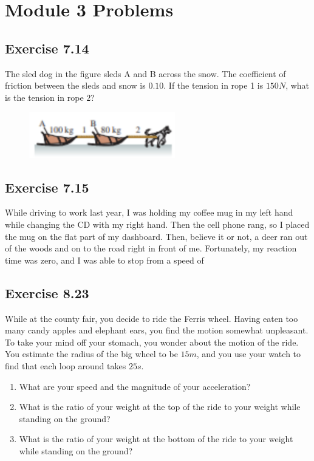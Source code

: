 \documentclass[11pt]{article}
\newenvironment{exercise}{
    \begin{mdframed}[style=problemstyle]\textcolor{black}{}
}{
    \end{mdframed}
}
\begin{document}
\section*{Module 3 Problems}
\subsection*{Exercise 7.14}
\begin{exercise}
    The sled dog in the figure sleds A and B across the snow. The coefficient
    of friction between the sleds and snow is $0.10$. If the tension in rope 1
    is $150N$, what is the tension in rope $2$?
\end{exercise}

\begin{figure}[ht!]
    \centering
    \includegraphics[width=2.5in]{images/exercise714.png}
\end{figure}

\newpage
\subsection*{Exercise 7.15}
\begin{exercise}
    While driving to work last year, I was holding 
    my coffee mug in my left hand while changing the CD 
    with my right hand. Then the cell phone rang, so I 
    placed the mug on the flat part of my dashboard. Then, 
    believe it or not, a deer ran out of the woods and on to 
    the road right in front of me. Fortunately, my reaction time was 
    zero, and I was able to stop from a speed of 
\end{exercise}

\subsection*{Exercise 8.23}
\begin{exercise}
    While at the county fair, you decide to ride the Ferris wheel. 
    Having eaten too many candy apples and elephant ears, you find the 
    motion somewhat unpleasant. To take your mind off your stomach, you 
    wonder about the motion of the ride. You estimate the radius of the 
    big wheel to be $15m$, and you use your watch to find that each loop 
    around takes $25s$.
    \begin{enumerate}[label=\alph*]
        \item What are your speed and the magnitude of your acceleration?
        \item What is the ratio of your weight at the top of the ride to 
            your weight while standing on the ground?
        \item What is the ratio of your weight at the bottom of the ride 
            to your weight while standing on the ground?
    \end{enumerate}
\end{exercise}
\end{document}
